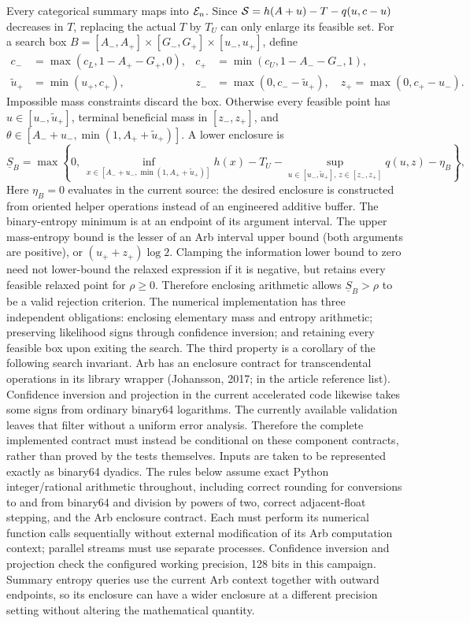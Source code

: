 Every categorical summary maps into $\mathcal E_n$. Since $\mathcal S=h(A+u)-T-q(u,c-u)$ decreases in $T$, replacing the actual $T$ by $T_U$ can only enlarge its feasible set. For a search box $B=[A_-,A_+]\times[G_-,G_+]\times[u_-,u_+]$, define
\begin{align}
 c_-&=\max(c_L,1-A_+-G_+,0),&c_+&=\min(c_U,1-A_--G_-,1),\\
 \tilde u_+&=\min(u_+,c_+),&
 z_-&=\max(0,c_--\tilde u_+),\quad z_+=\max(0,c_+-u_-).
\end{align}
Impossible mass constraints discard the box. Otherwise every feasible point has $u\in[u_-,\tilde u_+]$, terminal beneficial mass in $[z_-,z_+]$, and $\theta\in[A_-+u_-,\min(1,A_++\tilde u_+)]$. A lower enclosure is
\begin{equation}
 \underline S_B=\max\left\{0,\ \inf_{x\in[A_-+u_-,\min(1,A_++\tilde u_+)]}h(x)
       -T_U-\sup_{u\in[u_-,\tilde u_+],\,z\in[z_-,z_+]}q(u,z)-\eta_B\right\},
\end{equation}
Here $\eta_B=0$ evaluates in the current source: the desired enclosure is constructed from oriented helper operations instead of an engineered additive buffer. The binary-entropy minimum is at an endpoint of its argument interval. The upper mass-entropy bound is the lesser of an Arb interval upper bound (both arguments are positive), or $(u_++z_+)\log2$. Clamping the information lower bound to zero need not lower-bound the relaxed expression if it is negative, but retains every feasible relaxed point for $\rho\ge0$. Therefore enclosing arithmetic allows $\underline S_B>\rho$ to be a valid rejection criterion.
The numerical implementation has three independent obligations: enclosing elementary mass and entropy arithmetic; preserving likelihood signs through confidence inversion; and retaining every feasible box upon exiting the search. The third property is a corollary of the following search invariant. Arb has an enclosure contract for transcendental operations in its library wrapper (Johansson, 2017; in the article reference list). Confidence inversion and projection in the current accelerated code likewise takes some signs from ordinary binary64 logarithms. The currently available validation leaves that filter without a uniform error analysis. Therefore the complete implemented contract must instead be conditional on these component contracts, rather than proved by the tests themselves.
Inputs are taken to be represented exactly as binary64 dyadics. The rules below assume exact Python integer/rational arithmetic throughout, including correct rounding for conversions to and from binary64 and division by powers of two, correct adjacent-float stepping, and the Arb enclosure contract. Each must perform its numerical function calls sequentially without external modification of its Arb computation context; parallel streams must use separate processes. Confidence inversion and projection check the configured working precision, 128 bits in this campaign. Summary entropy queries use the current Arb context together with outward endpoints, so its enclosure can have a wider enclosure at a different precision setting without altering the mathematical quantity.
